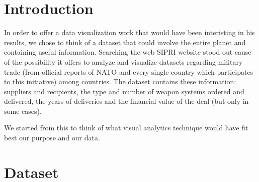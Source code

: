 \documentclass{article}
\begin{document}
\begin{multicols}{2}

\section{Introduction}
%
In order to offer a data visualization work that would have been interisting in his results, we chose to think of a dataset that could involve the entire planet and containing useful information. Searching the web SIPRI website stood out cause of the possibility it offers to analyze and visualize datasets regarding military trade (from official reports of NATO and every single country which participates to this initiative) among countries. The dataset contains these information: suppliers and recipients, the type and number of weapon systems ordered and delivered, the years of deliveries and the financial value of the deal (but only in some cases). 


We started from this to think of what visual analytics technique would have fit best our purpose and our data.



\section{Dataset}
%



\end{multicols}
\end{document}
